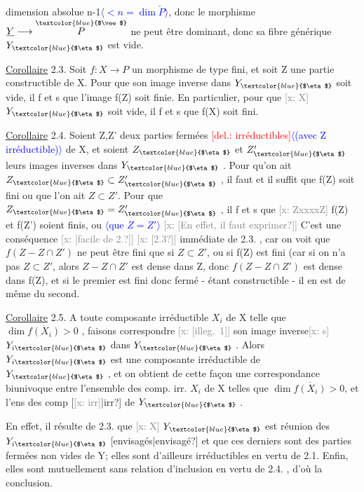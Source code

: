 \documentclass[11pt]{article}
\newcommand{\scanpage}[1]{\par\bigskip\noindent{\small\sffamily[scan #1]}\par}
\newcommand{\mspage}[1]{{\small\sffamily[p.\,#1]}}
\newcommand{\hand}[1]{\textcolor{blue}{#1}}
\newcommand{\inserted}[2][]{\textcolor{blue}{$\langle$#2$\rangle$}}
\newcommand{\deleted}[1]{\textcolor{red}{[\textsf{del.:} #1]}}
\newcommand{\xout}[1]{\textcolor{gray}{[\textsf{x:} #1]}}
\newcommand{\uline}[1]{\underline{#1}}
\newcommand{\unsure}[1]{[#1?]}
\newcommand{\illegible}[1]{[\textsf{illeg.\ #1}]}
\begin{document}
\mspage{\hand{8}}

\clearpage
\scanpage{25/9}
\mspage{6}

dimension absolue n-1\inserted{$< n = \dim \check{P}$}, donc le morphisme $\underline{Y}\longrightarrow \overset{\hand{$\vee$}}{P}$ ne peut être dominant,
donc sa fibre générique $Y_{\hand{$\eta$}}$ est vide.

\uline{Corollaire} 2.3. Soit $f:X\longrightarrow P$ un morphisme de type fini, et soit Z une
partie constructible de X. Pour que son image inverse dans $Y_{\hand{$\eta$}}$ soit vide,
il f et s que l'image f(Z) soit finie. En particulier, pour que \xout{X} $Y_{\hand{$\eta$}}$ soit
vide, il f et s que f(X) soit fini.

\uline{Corollaire} 2.4. Soient Z,Z' deux parties fermées \deleted{irréductibles}\inserted{(avec Z irréductible)} de X,
et soient $Z_{\hand{$\eta$}}$ et $Z'_{\hand{$\eta$}}$ leurs images inverses dans $Y_{\hand{$\eta$}}$ . Pour qu'on ait
$Z_{\hand{$\eta$}}\subset Z'_{\hand{$\eta$}}$ , il faut et il suffit que f(Z) soit fini ou que l'on ait $Z\subset Z'$.
Pour que $Z_{\hand{$\eta$}} = Z'_{\hand{$\eta$}}$ , il f et s que \xout{ZxxxxZ} f(Z) et f(Z') soient finis, ou \inserted{que $Z=Z'$}
\xout{\unsure{En effet, il faut exprimer}} C'est une conséquence \xout{\unsure{facile de 2.}}
\xout{\unsure{2.3}} immédiate de 2.3. , car on voit que $f(Z - Z\cap Z')$ ne peut être fini
que si $Z\subset Z'$, ou si f(Z) est fini (car si on n'a pas $Z\subset Z'$, alors $Z-Z\cap Z'$
est dense dans Z, donc $f(Z-Z\cap Z')$ est dense dans f(Z), et si le premier
est fini donc fermé - étant constructible - il en est de même du second.

\uline{Corollaire} 2.5. A toute composante irréductible $X_i$ de X telle que
$\dim \overline{f(X_i)} > 0$ , faisons correspondre \xout{\illegible{1}} son image inverse\xout{s} $Y_{i\hand{$\eta$}}$ dans
$Y_{\hand{$\eta$}}$ . Alors $Y_{i\hand{$\eta$}}$ est une composante irréductible de $Y_{\hand{$\eta$}}$ , et on obtient de
cette façon une correspondance biunivoque entre l'ensemble des comp. irr.
$X_i$ de X telles que $\dim \overline{f(X_i)}> 0$, et l'ens des comp \unsure{\xout{irr}|irr} de $Y_{\hand{$\eta$}}$ .

En effet, il résulte de 2.3. que \xout{X} $Y_{\hand{$\eta$}}$ est réunion des $Y_{i\hand{$\eta$}}$ \unsure{envisagés|envisagé}
et que ces derniers sont des parties fermées non vides de Y; elles sont
d'ailleurs irréductibles en vertu de 2.1. Enfin, elles sont mutuellement
sans relation d'inclusion en vertu de 2.4. , d'où la conclusion.
\end{document}
